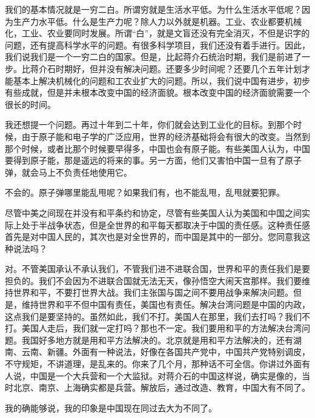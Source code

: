 我们的基本情况就是一穷二白。所谓穷就是生活水平低。为什么生活水平低呢？因为生产力水平低。什么是生产力呢？除人力以外就是机器。工业、农业都要机械化，工业、农业要同时发展。所谓“白”，就是文盲还没有完全消灭，不但是识字的问题，还有提高科学水平的问题。有很多科学项目，我们还没有着手进行。因此，我们说我们是一个一穷二白的国家。但是，比起蒋介石统治时期，我们是前进了一步。比蒋介石时期好，但并没有解决问题。还要多少时间呢？还要几个五年计划才能基本上解决机械化的问题和工农业扩大的问题。所以，我们说中国有进步，初步有些成就，但是并未根本改变中国的经济面貌。根本改变中国的经济面貌需要一个很长的时间。

我还想提一个问题。再过十年到二十年，你们就会达到工业化的目标。到那个时候，由于原子能和电子学的广泛应用，世界的经济基础将会有很大的改变。当然到那个时候，或者比那个时候要早得多，中国也会有原子能。有些美国人认为，中国要得到原子能，那是遥远的将来的事。另一方面，他们又害怕中国一旦有了原子弹，就会马上不负责任地使用它。

不会的。原子弹哪里能乱甩呢？如果我们有，也不能乱甩，乱甩就要犯罪。

尽管中美之间现在并没有和平条约和协定，尽管有些美国人认为美国和中国之间实际上处于半战争状态，但是全世界的和平每天都取决于中国的责任感。这种责任感首先是对中国人民的，其次也是对全世界的，而中国是其中的一部分。您同意我这种说法吗？

对。不管美国承认不承认我们，不管我们进不进联合国，世界和平的责任我们是要担负的。我们不会因为不进联合国就无法无天，像孙悟空大闹天宫那样。我们要维持世界和平，不要打世界大战。我们主张国与国之间不要用战争来解决问题。但是，维持世界和平不但中国有责任，美国也有责任。解决台湾问题是中国的内政，这点我们是要坚持的。虽然如此，我们不打。美国人在那里，我们去打吗？我们不打。美国人走后，我们就一定打吗？那也不一定。我们要用和平的方法解决台湾问题。我国好多地方就是用和平方法解决的。北京就是用和平方法解决的，还有湖南、云南、新疆。外面有一种说法，好像在各国共产党中，中国共产党特别调皮，不守规矩，不讲道理，是乱来的。你来了几个月，那种话不可全信。你讲过外面有人说，中国是一个大兵营和一个大监狱。对蒋介石的中国这样说，确实是像的，当时北京、南京、上海确实都是兵营。解放后，通过改造、教育，中国大有不同了。

我的确能够说，我的印象是中国现在同过去大为不同了。

